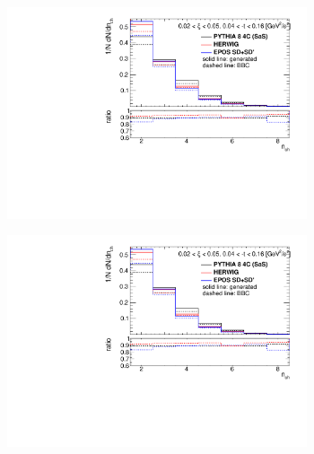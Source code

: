 \begin{figure}[h!]
	\centering
	\begin{subfigure}{.49\textwidth}
		\includegraphics[width=0.97\textwidth,page=5]{chapters/chrgSTAR/img/bbcCorrection/xi_bbc.pdf}
	\end{subfigure}
	\hfill
	\begin{subfigure}{.49\textwidth}
		\includegraphics[width=0.97\textwidth,page=10]{chapters/chrgSTAR/img/bbcCorrection/xi_bbc.pdf}
	\end{subfigure}
	\begin{subfigure}{.49\textwidth}

\end{subfigure}
\end{figure}
